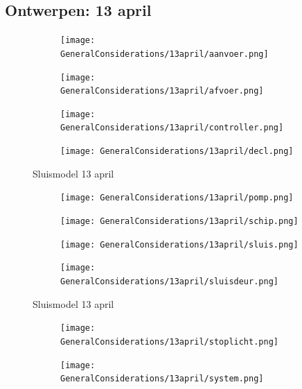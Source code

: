 \documentclass{article}
\begin{document}
	\subsection{Ontwerpen: 13 april}
	\begin{figure}
		\centering
		\begin{subfigure}{0.45\linewidth}
			\texttt{[image: GeneralConsiderations/13april/aanvoer.png]}
			\caption{}
			\label{fig:1a}
		\end{subfigure}\hfill
		\begin{subfigure}{0.45\linewidth}
			\texttt{[image: GeneralConsiderations/13april/afvoer.png]}
			\caption{}
			\label{fig:1a}
		\end{subfigure}
		
		\begin{subfigure}{0.45\linewidth}
			\texttt{[image: GeneralConsiderations/13april/controller.png]}
			\caption{}
			\label{fig:1a}
		\end{subfigure}\hfill
		\begin{subfigure}{0.45\linewidth}
			\texttt{[image: GeneralConsiderations/13april/decl.png]}
			\caption{}
			\label{fig:1a}
		\end{subfigure}
		\caption{Sluismodel 13 april}
		\label{fig:1}
	\end{figure}
	\begin{figure}
		\centering
		\begin{subfigure}{0.45\linewidth}
			\texttt{[image: GeneralConsiderations/13april/pomp.png]}
			\caption{}
			\label{fig:1a}
		\end{subfigure}\hfill
		\begin{subfigure}{0.45\linewidth}
			\texttt{[image: GeneralConsiderations/13april/schip.png]}
			\caption{}
			\label{fig:1a}
		\end{subfigure}
		
		\begin{subfigure}{0.45\linewidth}
			\texttt{[image: GeneralConsiderations/13april/sluis.png]}
			\caption{}
			\label{fig:1a}
		\end{subfigure}\hfill
		\begin{subfigure}{0.45\linewidth}
			\texttt{[image: GeneralConsiderations/13april/sluisdeur.png]}
			\caption{}
			\label{fig:1a}
		\end{subfigure}
		\caption{Sluismodel 13 april}
		\label{fig:1}
	\end{figure}
	
	\begin{figure}
		\centering
		\begin{subfigure}{0.45\linewidth}
			\texttt{[image: GeneralConsiderations/13april/stoplicht.png]}
			\caption{}
			\label{fig:1a}
		\end{subfigure}\hfill
		\begin{subfigure}{0.45\linewidth}
			\texttt{[image: GeneralConsiderations/13april/system.png]}
			\caption{}
			\label{fig:1a}
		\end{subfigure}
	\end{figure}
	\newpage
\end{document}
